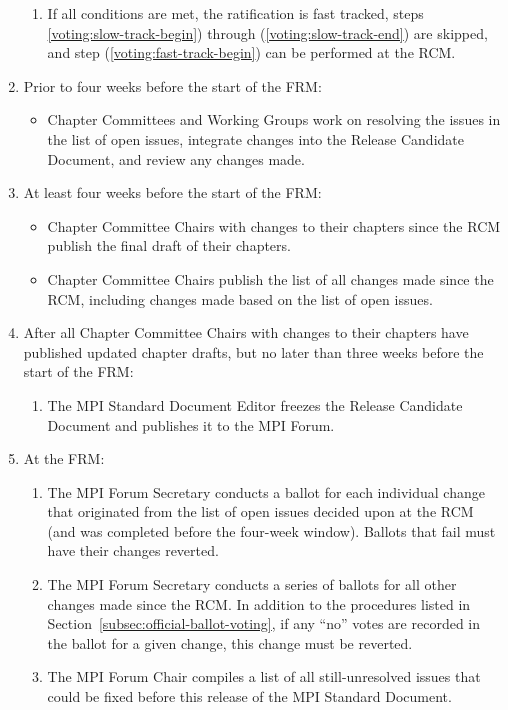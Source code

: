 \begin{enumerate}
\begin{enumerate}
    \item If all conditions are met, the ratification is fast tracked,
      steps \ref{voting:slow-track-begin}) through
        (\ref{voting:slow-track-end}) are skipped, and step
        (\ref{voting:fast-track-begin}) can be performed at the RCM.
  \end{enumerate}

\item\label{voting:slow-track-begin} Prior to four weeks before the
  start of the FRM:
  \label{subsec:official-ballot-voting:t-4weeks-frm}
  \begin{itemize}
  \item Chapter Committees and Working Groups work on resolving the
    issues in the list of open issues, integrate changes
    into the Release Candidate Document, and review any
    changes made.
  \end{itemize}

\item At least four weeks before the start of the FRM:
  \begin{itemize}
  \item Chapter Committee Chairs with changes to their chapters since
    the RCM publish the final draft of their chapters.
  \item Chapter Committee Chairs publish the list of all
    changes made since the RCM, including changes made based on the
    list of open issues.
  \end{itemize}

\item After all Chapter Committee Chairs with changes to their
  chapters have published updated chapter drafts, but no later than
  three weeks before the start of the FRM:
  \begin{enumerate}
  \item The MPI Standard Document Editor freezes the Release Candidate
    Document and publishes it to the MPI Forum.
  \end{enumerate}

\item At the FRM:
  \begin{enumerate}
  \item The MPI Forum Secretary conducts a ballot for each individual
    change that originated from the list of open issues decided upon
    at the RCM (and was completed before the four-week window).
    Ballots that fail must have their changes reverted.
  \item\label{voting:slow-track-end} The MPI Forum Secretary conducts
    a series of ballots for all other changes made since the RCM.  In
    addition to the procedures listed in
    Section~\ref{subsec:official-ballot-voting}, if any ``no'' votes
    are recorded in the ballot for a given change, this change must be
    reverted.
  \item\label{voting:fast-track-begin} The MPI Forum Chair compiles a
    list of all still-unresolved issues that could be fixed before
    this release of the MPI Standard Document.


\end{enumerate}
\end{enumerate}
